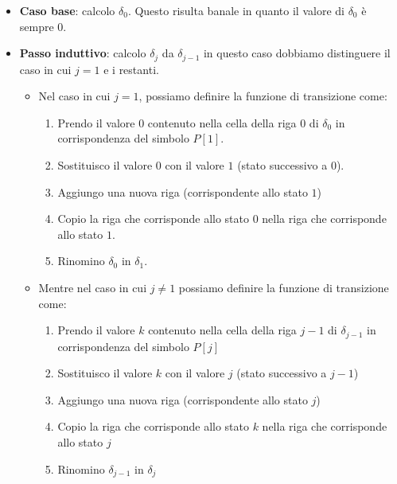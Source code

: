 \begin{itemize}
    \item \textbf{Caso base}: calcolo $\delta_0$. Questo risulta banale in quanto
          il valore di $\delta_0$ è sempre $0$.
    \item \textbf{Passo induttivo}: calcolo $\delta_j$ da $\delta_{j - 1}$ in
          questo caso dobbiamo distinguere il caso in cui $j = 1$ e i restanti.
          \begin{itemize}
              \item Nel caso in cui $j = 1$, possiamo definire la funzione di
                    transizione come:
                    \begin{enumerate}
                        \item Prendo il valore $0$ contenuto nella cella della
                              riga $0$ di $\delta_0$ in corrispondenza del
                              simbolo $P[1]$.
                        \item Sostituisco il valore $0$ con il valore $1$ (stato
                              successivo a $0$).
                        \item Aggiungo una nuova riga (corrispondente allo stato
                              $1$)
                        \item Copio la riga che corrisponde allo stato $0$ nella
                              riga che corrisponde allo stato $1$.
                        \item Rinomino $\delta_0$ in $\delta_1$.
                    \end{enumerate}
              \item Mentre nel caso in cui $j \neq 1$ possiamo definire la
                    funzione di transizione come:
                    \begin{enumerate}
                        \item Prendo il valore $k$ contenuto nella cella della
                              riga $j - 1$ di $\delta_{j - 1}$ in corrispondenza
                              del simbolo $P[j]$
                        \item Sostituisco il valore $k$ con il valore $j$ (stato
                              successivo a $j - 1$)
                        \item Aggiungo una nuova riga (corrispondente allo stato
                              $j$)
                        \item Copio la riga che corrisponde allo stato $k$ nella
                              riga che corrisponde allo stato $j$
                        \item Rinomino $\delta_{j - 1}$ in $\delta_j$
                    \end{enumerate}
          \end{itemize}
\end{itemize}
